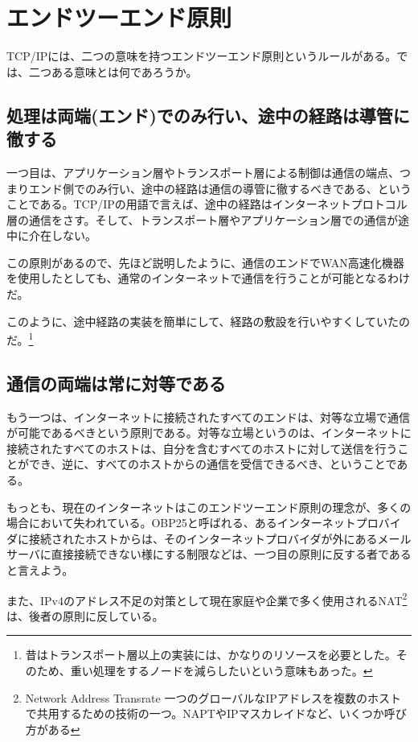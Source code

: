 \section{エンドツーエンド原則}
TCP/IPには、二つの意味を持つエンドツーエンド原則というルールがある。では、二つある意味とは何であろうか。

\subsection{処理は両端(エンド)でのみ行い、途中の経路は導管に徹する}

一つ目は、アプリケーション層やトランスポート層による制御は通信の端点、つまりエンド側でのみ行い、途中の経路は通信の導管に徹するべきである、ということである。TCP/IPの用語で言えば、途中の経路はインターネットプロトコル層の通信をさす。そして、トランスポート層やアプリケーション層での通信が途中に介在しない。

この原則があるので、先ほど説明したように、通信のエンドでWAN高速化機器を使用したとしても、通常のインターネットで通信を行うことが可能となるわけだ。

このように、途中経路の実装を簡単にして、経路の敷設を行いやすくしていたのだ。\footnote{昔はトランスポート層以上の実装には、かなりのリソースを必要とした。そのため、重い処理をするノードを減らしたいという意味もあった。}

\subsection{通信の両端は常に対等である}

もう一つは、インターネットに接続されたすべてのエンドは、対等な立場で通信が可能であるべきという原則である。対等な立場というのは、インターネットに接続されたすべてのホストは、自分を含むすべてのホストに対して送信を行うことができ、逆に、すべてのホストからの通信を受信できるべき、ということである。

もっとも、現在のインターネットはこのエンドツーエンド原則の理念が、多くの場合において失われている。OBP25と呼ばれる、あるインターネットプロバイダに接続されたホストからは、そのインターネットプロバイダが外にあるメールサーバに直接接続できない様にする制限などは、一つ目の原則に反する者であると言えよう。

また、IPv4のアドレス不足の対策として現在家庭や企業で多く使用されるNAT\footnote{Network Address Transrate 一つのグローバルなIPアドレスを複数のホストで共用するための技術の一つ。NAPTやIPマスカレイドなど、いくつか呼び方がある}は、後者の原則に反している。


